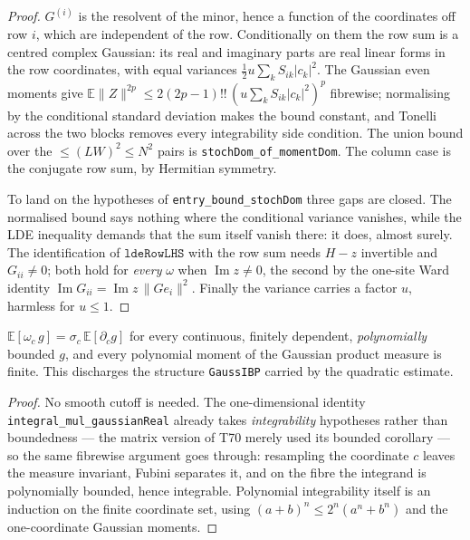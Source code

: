 \begin{proof}\leanok{}
  $G^{(i)}$ is the resolvent of the minor, hence a function of the coordinates off row $i$, which
  are independent of the row.  Conditionally on them the row sum is a centred complex Gaussian:
  its real and imaginary parts are real linear forms in the row coordinates, with equal variances
  $\tfrac12 u\sum_kS_{ik}|c_k|^2$.  The Gaussian even moments give
  $\mathbb E\|Z\|^{2p}\le2(2p-1)!!\,(u\sum_kS_{ik}|c_k|^2)^p$ fibrewise; normalising by the
  conditional standard deviation makes the bound constant, and Tonelli across the two blocks
  removes every integrability side condition.  The union bound over the $\le(LW)^2\le N^2$ pairs
  is \texttt{stochDom\_of\_momentDom}.  The column case is the conjugate row sum, by Hermitian
  symmetry.

  To land on the hypotheses of \texttt{entry\_bound\_stochDom} three gaps are closed.  The
  normalised bound says nothing where the conditional variance vanishes, while the LDE
  inequality demands that the sum itself vanish there: it does, almost surely.  The
  identification of $\mathtt{ldeRowLHS}$ with the row sum needs $H-z$ invertible and
  $G_{ii}\ne0$; both hold for \emph{every} $\omega$ when $\operatorname{Im}z\ne0$, the second by
  the one-site Ward identity $\operatorname{Im}G_{ii}=\operatorname{Im}z\,\|Ge_i\|^2$.  Finally
  the variance carries a factor $u$, harmless for $u\le1$.
\end{proof}

\begin{lemma}\label{lem:gauss-ibp}
  \leanok{}
  $\mathbb E[\omega_c\,g]=\sigma_c\,\mathbb E[\partial_c g]$ for every continuous, finitely
  dependent, \emph{polynomially} bounded $g$, and every polynomial moment of the Gaussian
  product measure is finite.  This discharges the structure \texttt{GaussIBP} carried by the
  quadratic estimate.
\end{lemma}
\begin{proof}\leanok
  No smooth cutoff is needed.  The one-dimensional identity
  \texttt{integral\_mul\_gaussianReal} already takes \emph{integrability} hypotheses rather
  than boundedness --- the matrix version of T70 merely used its bounded corollary --- so the
  same fibrewise argument goes through: resampling the coordinate $c$ leaves the measure
  invariant, Fubini separates it, and on the fibre the integrand is polynomially bounded, hence
  integrable.  Polynomial integrability itself is an induction on the finite coordinate set,
  using $(a+b)^n\le2^n(a^n+b^n)$ and the one-coordinate Gaussian moments.
\end{proof}

